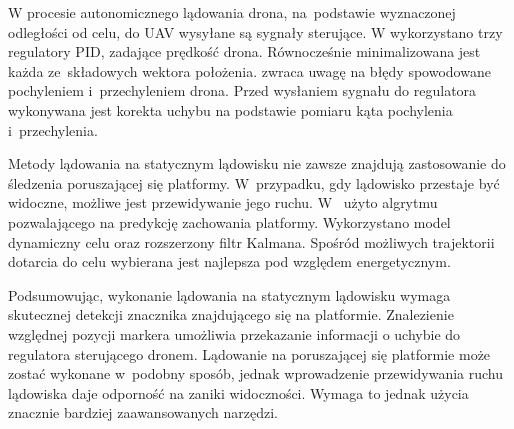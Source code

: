 W procesie autonomicznego lądowania drona, na~podstawie wyznaczonej odległości od celu, do UAV wysyłane są sygnały sterujące. W \cite{Sudevan} wykorzystano trzy regulatory PID, zadające prędkość drona. Równocześnie minimalizowana jest każda ze~składowych wektora położenia. \cite{Rings} zwraca uwagę na błędy spowodowane pochyleniem i~przechyleniem drona. Przed wysłaniem sygnału do regulatora wykonywana jest korekta uchybu na podstawie pomiaru kąta pochylenia i~przechylenia.\par 
Metody lądowania na statycznym lądowisku nie zawsze znajdują zastosowanie do śledzenia poruszającej się platformy. W~przypadku, gdy lądowisko przestaje być widoczne, możliwe jest przewidywanie jego ruchu.  W~\cite{Falanga} użyto algrytmu pozwalającego na predykcję zachowania platformy. Wykorzystano model dynamiczny celu oraz rozszerzony filtr Kalmana. Spośród możliwych trajektorii dotarcia do celu wybierana jest najlepsza pod względem energetycznym.\par 
Podsumowując, wykonanie lądowania na statycznym lądowisku wymaga skutecznej detekcji znacznika znajdującego się na platformie. Znalezienie względnej pozycji markera umożliwia przekazanie informacji o uchybie do regulatora sterującego dronem. Lądowanie na poruszającej się platformie może zostać wykonane w~podobny sposób, jednak wprowadzenie przewidywania ruchu lądowiska daje odporność na zaniki widoczności. Wymaga to jednak użycia znacznie bardziej zaawansowanych narzędzi.








